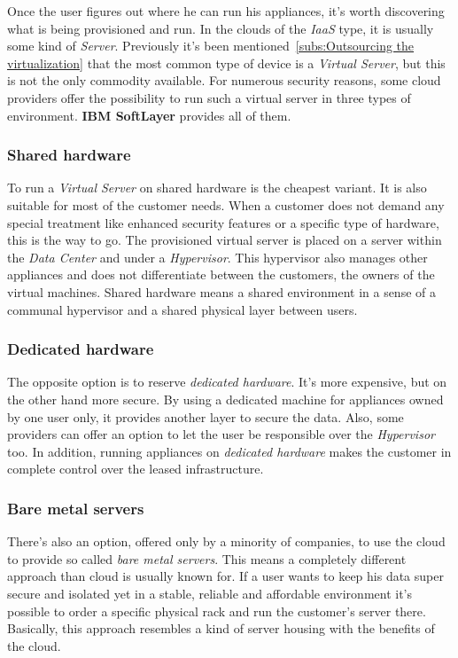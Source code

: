 Once the user figures out where he can run his appliances, it's worth discovering what is being provisioned and run. In the clouds of the \emph{IaaS} type, it is usually some kind of \emph{Server}. Previously it's been mentioned~\ref{subs:Outsourcing the virtualization} that the most common type of device is a \emph{Virtual Server}, but this is not the only commodity available. For numerous security reasons, some cloud providers offer the possibility to run such a virtual server in three types of environment. \textbf{IBM SoftLayer} provides all of them.

\subsubsection{Shared hardware}
\label{subs:Shared hardware}

To run a \emph{Virtual Server} on shared hardware is the cheapest variant. It is also suitable for most of the customer needs. When a customer does not demand any special treatment like enhanced security features or a specific type of hardware, this is the way to go. The provisioned virtual server is placed on a server within the \emph{Data Center} and under a \emph{Hypervisor}. This hypervisor also manages other appliances and does not differentiate between the customers, the owners of the virtual machines. Shared hardware means a shared environment in a sense of a communal hypervisor and a shared physical layer between users.

\subsubsection{Dedicated hardware}
\label{subs:Dedicated hardware}

The opposite option is to reserve \emph{dedicated hardware}. It's more expensive, but on the other hand more secure. By using a dedicated machine for appliances owned by one user only, it provides another layer to secure the data. Also, some providers can offer an option to let the user be responsible over the \emph{Hypervisor} too. In addition, running appliances on \emph{dedicated hardware} makes the customer in complete control over the leased infrastructure.

\subsubsection{Bare metal servers}
\label{subs:Bare metal servers}

There's also an option, offered only by a minority of companies, to use the cloud to provide so called \emph{bare metal servers}. This means a completely different approach than cloud is usually known for. If a user wants to keep his data super secure and isolated yet in a stable, reliable and affordable environment it's possible to order a specific physical rack and run the customer's server there. Basically, this approach resembles a kind of server housing with the benefits of the cloud.

